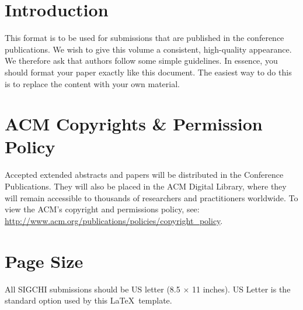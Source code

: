 \documentclass{sigchi-ext}
\begin{document}
\section{Introduction}
This format is to be used for submissions that are published in the
conference publications. We wish to give this volume a consistent,
high-quality appearance. We therefore ask that authors follow some
simple guidelines. In essence, you should format your paper exactly
like this document. The easiest way to do this is to replace the
content with your own material.

\section{ACM Copyrights \& Permission Policy}
Accepted extended abstracts and papers will be distributed in the
Conference Publications. They will also be placed in the ACM Digital
Library, where they will remain accessible to thousands of researchers
and practitioners worldwide. To view the ACM's copyright and
permissions policy, see:
\url{http://www.acm.org/publications/policies/copyright_policy}.


\section{Page Size}
All SIGCHI submissions should be US letter (8.5 $\times$ 11
inches). US Letter is the standard option used by this \LaTeX\
template.
\end{document}
